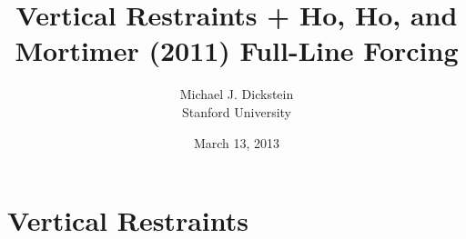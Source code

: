 %
%
%
%
%
%


\def\beamerclassoptions{[notes=show]}

\usepackage{amssymb}
\usepackage{mathpazo}
\usepackage{hyperref}
\usepackage{multimedia}


\newenvironment{stepenumerate}{\begin{enumerate}[<+->]}{\end{enumerate}}
\newenvironment{stepitemize}{\begin{itemize}[<+->]}{\end{itemize} }
\newenvironment{stepenumeratewithalert}{\begin{enumerate}[<+-| alert@+>]}{\end{enumerate}}
\newenvironment{stepitemizewithalert}{\begin{itemize}[<+-| alert@+>]}{\end{itemize} }

%



\title{Vertical Restraints + Ho, Ho, and Mortimer (2011) Full-Line Forcing}
\author[MJ Dickstein]{Michael J. Dickstein \\
Stanford University}
\date[3/13/13]{March 13, 2013}
\maketitle

\section{Vertical Restraints}

